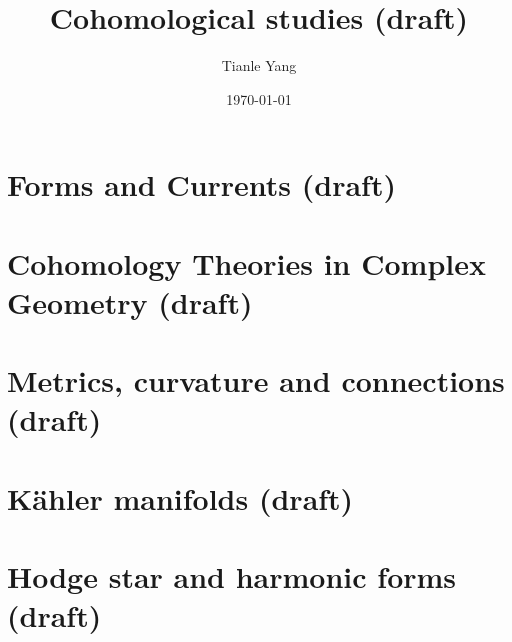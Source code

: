 \documentclass[sectionlevel=chapter]{noteformyself}
\title{Cohomological studies (draft)}
\author{Tianle Yang}
\date{\today}
\begin{document}
    \maketitle

    \tableofcontents

    \section{Forms and Currents (draft)}
    
    \section{Cohomology Theories in Complex Geometry (draft)}
    
    \section{Metrics, curvature and connections (draft)}
    
    \section{Kähler manifolds (draft)}
    
    \section{Hodge star and harmonic forms (draft)}
    

    \printbibliography[heading=bibintoc, title={References}]
\end{document}
